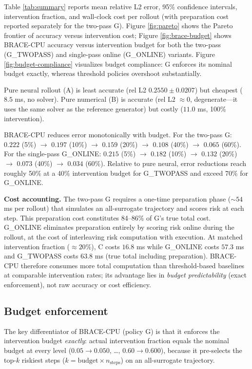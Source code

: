 \documentclass[11pt]{article}
\begin{document}
Table \ref{tab:summary} reports mean relative L2 error, 95\% confidence
intervals, intervention fraction, and wall-clock cost per rollout (with
preparation cost reported separately for the two-pass G). Figure
\ref{fig:pareto} shows the Pareto frontier of accuracy versus intervention
cost; Figure \ref{fig:brace-budget} shows BRACE-CPU accuracy versus
intervention budget for both the two-pass (G\_TWOPASS) and single-pass online
(G\_ONLINE) variants. Figure \ref{fig:budget-compliance} visualizes budget
compliance: G enforces its nominal budget exactly, whereas threshold policies
overshoot substantially.

Pure neural rollout (A) is least accurate (rel L2 $0.2550 \pm 0.0207$) but
cheapest ($8.5$ ms, no solver). Pure numerical (B) is accurate (rel L2
$\approx 0$, degenerate---it uses the same solver as the reference generator)
but costly ($11.0$ ms, 100\% intervention).

BRACE-CPU reduces error monotonically with budget. For the two-pass G:
$0.222$ (5\%) $\to$ $0.197$ (10\%) $\to$ $0.159$ (20\%) $\to$ $0.108$ (40\%)
$\to$ $0.065$ (60\%). For the single-pass G\_ONLINE: $0.215$ (5\%) $\to$
$0.182$ (10\%) $\to$ $0.132$ (20\%) $\to$ $0.073$ (40\%) $\to$ $0.034$ (60\%).
Relative to pure neural, error reductions reach roughly 50\% at a 40\%
intervention budget for G\_TWOPASS and exceed 70\% for G\_ONLINE.

\textbf{Cost accounting.} The two-pass G requires a one-time preparation phase
($\sim 54$ ms per rollout) that simulates an all-surrogate trajectory and
scores risk at each step. This preparation cost constitutes 84--86\% of G's
true total cost. G\_ONLINE eliminates preparation entirely by scoring risk
online during the rollout, at the cost of interleaving risk computation with
execution. At matched intervention fraction ($\approx 20\%$), C costs $16.8$ ms
while G\_ONLINE costs $57.3$ ms and G\_TWOPASS costs $63.8$ ms (true total
including preparation). BRACE-CPU therefore consumes more total computation
than threshold-based baselines at comparable intervention rates; its advantage
lies in \emph{budget predictability} (exact enforcement), not raw accuracy or
cost efficiency.

\subsection{Budget enforcement}
\label{sec:results-budget}

The key differentiator of BRACE-CPU (policy G) is that it enforces the
intervention budget \emph{exactly}: actual intervention fraction equals the
nominal budget at every level ($0.05 \to 0.050$, \ldots, $0.60 \to 0.600$),
because it pre-selects the top-$k$ riskiest steps ($k=\text{budget}\times
n_\text{steps}$) on an all-surrogate trajectory.
\end{document}
